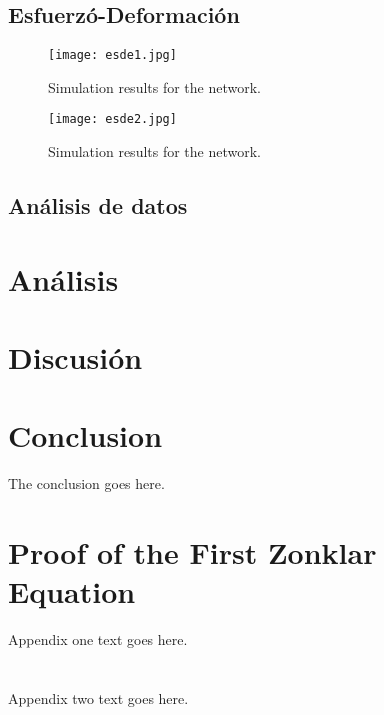 \documentclass[journal,transmag]{IEEEtran}
\begin{document}
\subsection{Esfuerzó-Deformación}
\begin{figure}[!h]
\center
\texttt{[image: esde1.jpg]}
\caption{Simulation results for the network.}
\label{figs}
\end{figure}
\begin{figure}[!h]
\center
\texttt{[image: esde2.jpg]}
\caption{Simulation results for the network.}
\label{figs}
\end{figure}
\subsection{Análisis de datos}



\section{Análisis}

\section{Discusión}


\section{Conclusion}
	The conclusion goes here.


\appendices
\section{Proof of the First Zonklar Equation}
	Appendix one text goes here.

\section{}
	Appendix two text goes here.

\ifCLASSOPTIONcaptionsoff
  \newpage
\fi



\end{document}
